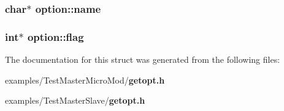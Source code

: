 \subsubsection{\setlength{\rightskip}{0pt plus 5cm}char$\ast$ {\bf option::name}}\label{structoption_92c850a23c7828c1dba453bf8d15e1f0}


\subsubsection{\setlength{\rightskip}{0pt plus 5cm}int$\ast$ {\bf option::flag}}\label{structoption_b366eea5fe7be25c1928328ba715e353}




The documentation for this struct was generated from the following files:\begin{CompactItemize}
\item 
examples/Test\-Master\-Micro\-Mod/{\bf getopt.h}\item 
examples/Test\-Master\-Slave/{\bf getopt.h}\end{CompactItemize}
